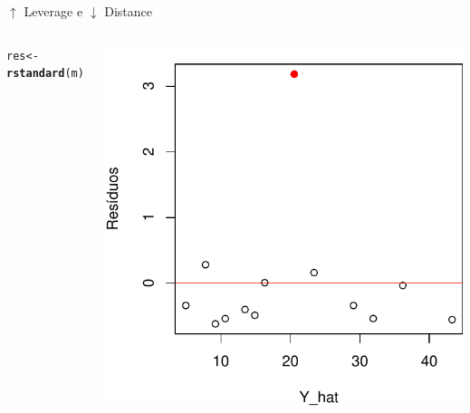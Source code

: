 \documentclass{beamer}\usepackage[]{graphicx}\usepackage[]{color}
\makeatletter
\newcommand{\hlstd}[1]{\textcolor[rgb]{0.345,0.345,0.345}{#1}}%
\newcommand{\hlkwb}[1]{\textcolor[rgb]{0.69,0.353,0.396}{#1}}%
\newcommand{\hlkwd}[1]{\textcolor[rgb]{0.737,0.353,0.396}{\textbf{#1}}}%
\newenvironment{kframe}{%
 \def\at@end@of@kframe{}%
 \ifinner\ifhmode%
  \def\at@end@of@kframe{\end{minipage}}%
  \begin{minipage}{\columnwidth}%
 \fi\fi%
 \def\FrameCommand##1{\hskip\@totalleftmargin \hskip-\fboxsep
 \colorbox{shadecolor}{##1}\hskip-\fboxsep
     \hskip-\linewidth \hskip-\@totalleftmargin \hskip\columnwidth}%
 \MakeFramed {\advance\hsize-\width
   \@totalleftmargin\z@ \linewidth\hsize
   \@setminipage}}%
 {\par\unskip\endMakeFramed%
 \at@end@of@kframe}
\newenvironment{knitrout}{}{} %
\renewenvironment{knitrout}{\setlength{\topsep}{0mm}}{}
\makeatother
\begin{document}
\begin{frame}{$\uparrow$ Leverage e $\downarrow$ Distance}
\begin{columns}[c]
\begin{knitrout}\tiny
{}\color{fgcolor}\begin{kframe}
\begin{alltt}
\hlstd{res} \hlkwb{<-} \hlkwd{rstandard}\hlstd{(m)}
\end{alltt}
\end{kframe}
\includegraphics[width=1\linewidth]{figure/inf202-1} 

\end{knitrout}

\end{columns}
\end{frame}
\end{document}
